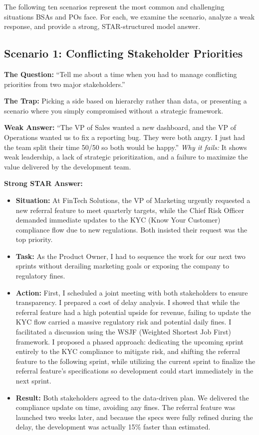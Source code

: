 The following ten scenarios represent the most common and challenging
situations BSAs and POs face. For each, we examine the scenario, analyze
a weak response, and provide a strong, STAR-structured model answer.

\subsection{Scenario 1: Conflicting Stakeholder
Priorities}\label{scenario-1-conflicting-stakeholder-priorities}

\textbf{The Question:} ``Tell me about a time when you had to manage
conflicting priorities from two major stakeholders.''

\textbf{The Trap:} Picking a side based on hierarchy rather than data,
or presenting a scenario where you simply compromised without a
strategic framework.

\textbf{Weak Answer:} ``The VP of Sales wanted a new dashboard, and the
VP of Operations wanted us to fix a reporting bug. They were both angry.
I just had the team split their time 50/50 so both would be happy.''
\emph{Why it fails:} It shows weak leadership, a lack of strategic
prioritization, and a failure to maximize the value delivered by the
development team.

\textbf{Strong STAR Answer:}

\begin{itemize}
\tightlist
\item
  \textbf{Situation:} At FinTech Solutions, the VP of Marketing urgently
  requested a new referral feature to meet quarterly targets, while the
  Chief Risk Officer demanded immediate updates to the KYC (Know Your
  Customer) compliance flow due to new regulations. Both insisted their
  request was the top priority.
\item
  \textbf{Task:} As the Product Owner, I had to sequence the work for
  our next two sprints without derailing marketing goals or exposing the
  company to regulatory fines.
\item
  \textbf{Action:} First, I scheduled a joint meeting with both
  stakeholders to ensure transparency. I prepared a cost of delay
  analysis. I showed that while the referral feature had a high
  potential upside for revenue, failing to update the KYC flow carried a
  massive regulatory risk and potential daily fines. I facilitated a
  discussion using the WSJF (Weighted Shortest Job First) framework. I
  proposed a phased approach: dedicating the upcoming sprint entirely to
  the KYC compliance to mitigate risk, and shifting the referral feature
  to the following sprint, while utilizing the current sprint to
  finalize the referral feature's specifications so development could
  start immediately in the next sprint.
\item
  \textbf{Result:} Both stakeholders agreed to the data-driven plan. We
  delivered the compliance update on time, avoiding any fines. The
  referral feature was launched two weeks later, and because the specs
  were fully refined during the delay, the development was actually 15\%
  faster than estimated.
\end{itemize}


